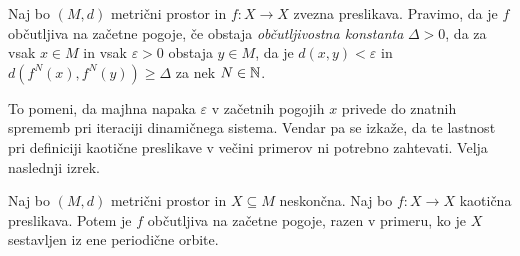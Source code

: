 \begin{definicija}
    Naj bo \((M, d)\) metrični prostor in \(f \colon X \to X\) zvezna preslikava. Pravimo, da je \(f\) občutljiva na začetne pogoje, če obstaja \emph{občutljivostna konstanta} \(\Delta > 0\), da za vsak \(x \in M\) in vsak \(\varepsilon > 0\) obstaja \(y \in M\), da je \(d (x, y) < \varepsilon\) in \(d (f^N (x), f^N (y)) \geq \Delta\) za nek \(N \in \mathbb N\).
\end{definicija}

\noindent To pomeni, da majhna napaka \(\varepsilon\) v začetnih pogojih \(x\) privede do znatnih sprememb pri iteraciji dinamičnega sistema. Vendar pa se izkaže, da te lastnost pri definiciji kaotične preslikave v večini primerov ni potrebno zahtevati. Velja naslednji izrek.

\begin{izrek}
    Naj bo \((M, d)\) metrični prostor in \(X \subseteq M\) neskončna. Naj bo \(f \colon X \to X\) kaotična preslikava. Potem je \(f\) občutljiva na začetne pogoje, razen v primeru, ko je \(X\) sestavljen iz ene periodične orbite.
\end{izrek}

